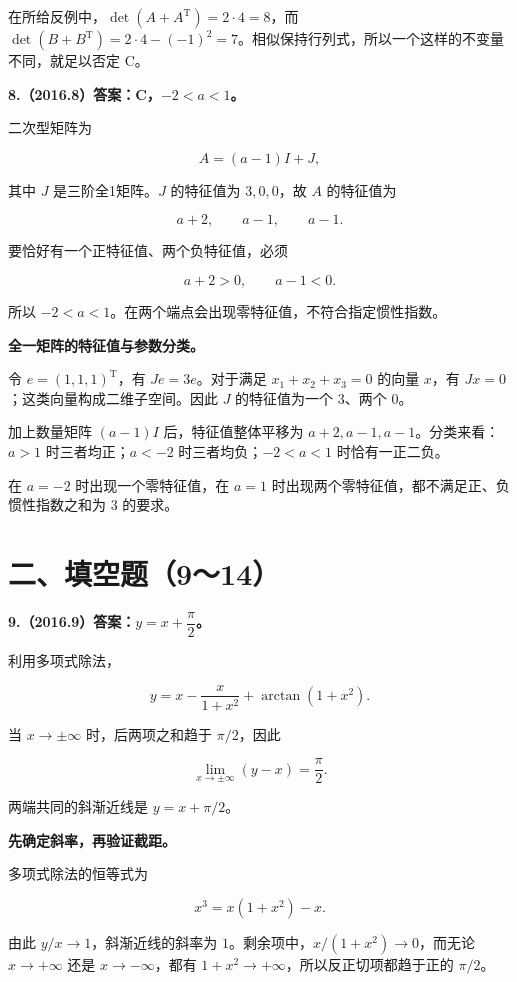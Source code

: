 \documentclass[UTF8,11pt,fontset=windows]{ctexart}
\begin{document}
在所给反例中，$\det(A+A^{\mathrm T})=2\cdot4=8$，而 $\det(B+B^{\mathrm T})=2\cdot4-(-1)^2=7$。相似保持行列式，所以一个这样的不变量不同，就足以否定 C。

\clearpage

\textbf{8.（2016.8）答案：C，$-2<a<1$。}

二次型矩阵为

$$
A=(a-1)I+J,
$$

其中 $J$ 是三阶全1矩阵。$J$ 的特征值为 $3,0,0$，故 $A$ 的特征值为

$$
a+2,\qquad a-1,\qquad a-1.
$$

要恰好有一个正特征值、两个负特征值，必须

$$
a+2>0,\qquad a-1<0.
$$

所以 $-2<a<1$。在两个端点会出现零特征值，不符合指定惯性指数。

\textbf{全一矩阵的特征值与参数分类。}

令 $e=(1,1,1)^{\mathrm T}$，有 $Je=3e$。对于满足 $x_1+x_2+x_3=0$ 的向量 $x$，有 $Jx=0$；这类向量构成二维子空间。因此 $J$ 的特征值为一个 $3$、两个 $0$。

加上数量矩阵 $(a-1)I$ 后，特征值整体平移为 $a+2,a-1,a-1$。分类来看：$a>1$ 时三者均正；$a<-2$ 时三者均负；$-2<a<1$ 时恰有一正二负。

在 $a=-2$ 时出现一个零特征值，在 $a=1$ 时出现两个零特征值，都不满足正、负惯性指数之和为 $3$ 的要求。

\clearpage

\section*{二、填空题（9～14）}

\textbf{9.（2016.9）答案：$y=x+\dfrac\pi2$。}

利用多项式除法，

$$
y=x-\frac{x}{1+x^2}+\arctan(1+x^2).
$$

当 $x\to\pm\infty$ 时，后两项之和趋于 $\pi/2$，因此

$$
\lim_{x\to\pm\infty}(y-x)=\frac\pi2.
$$

两端共同的斜渐近线是 $y=x+\pi/2$。

\textbf{先确定斜率，再验证截距。}

多项式除法的恒等式为

$$
x^3=x(1+x^2)-x.
$$

由此 $y/x\to1$，斜渐近线的斜率为 $1$。剩余项中，$x/(1+x^2)\to0$，而无论 $x\to+\infty$ 还是 $x\to-\infty$，都有 $1+x^2\to+\infty$，所以反正切项都趋于正的 $\pi/2$。
\end{document}

